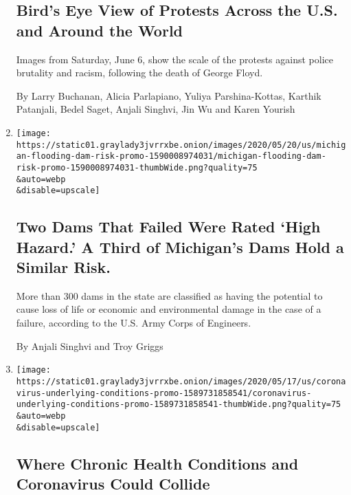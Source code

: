 \begin{enumerate}
  \hypertarget{birds-eye-view-of-protests-across-the-us-and-around-the-world}{%
  \subsection{Bird's Eye View of Protests Across the U.S. and Around the
  World}\label{birds-eye-view-of-protests-across-the-us-and-around-the-world}}

  Images from Saturday, June 6, show the scale of the protests against
  police brutality and racism, following the death of George Floyd.

  By Larry Buchanan, Alicia Parlapiano, Yuliya Parshina-Kottas, Karthik
  Patanjali, Bedel Saget, Anjali Singhvi, Jin Wu and Karen Yourish
\item
  \href{/interactive/2020/05/20/us/michigan-flooding-dam-risk.html}{}

  \texttt{[image: https://static01.graylady3jvrrxbe.onion/images/2020/05/20/us/michigan-flooding-dam-risk-promo-1590008974031/michigan-flooding-dam-risk-promo-1590008974031-thumbWide.png?quality=75\\\&auto=webp\\\&disable=upscale]}

  \hypertarget{two-dams-that-failed-were-rated-high-hazard-a-third-of-michigans-dams-hold-a-similar-risk}{%
  \subsection{Two Dams That Failed Were Rated `High Hazard.' A Third of
  Michigan's Dams Hold a Similar
  Risk.}\label{two-dams-that-failed-were-rated-high-hazard-a-third-of-michigans-dams-hold-a-similar-risk}}

  More than 300 dams in the state are classified as having the potential
  to cause loss of life or economic and environmental damage in the case
  of a failure, according to the U.S. Army Corps of Engineers.

  By Anjali Singhvi and Troy Griggs
\item
  \href{/interactive/2020/05/18/us/coronavirus-underlying-conditions.html}{}

  \texttt{[image: https://static01.graylady3jvrrxbe.onion/images/2020/05/17/us/coronavirus-underlying-conditions-promo-1589731858541/coronavirus-underlying-conditions-promo-1589731858541-thumbWide.png?quality=75\\\&auto=webp\\\&disable=upscale]}

  \hypertarget{where-chronic-health-conditions-and-coronavirus-could-collide}{%
  \subsection{Where Chronic Health Conditions and Coronavirus Could
  Collide}\label{where-chronic-health-conditions-and-coronavirus-could-collide}}


\end{enumerate}
